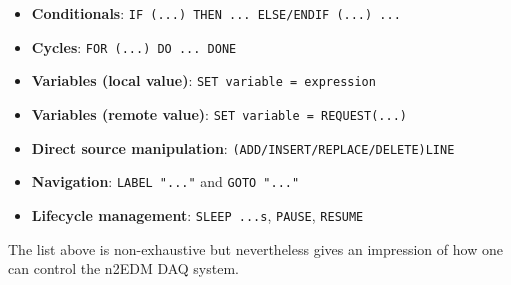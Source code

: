 \begin{itemize}
	\item \textbf{Conditionals}: \texttt{IF (...) THEN ... ELSE/ENDIF (...) ...}
	\item \textbf{Cycles}: \texttt{FOR (...) DO ... DONE}
	\item \textbf{Variables (local value)}: \texttt{SET variable = expression}
	\item \textbf{Variables (remote value)}: \texttt{SET variable = REQUEST(...)}
	\item \textbf{Direct source manipulation}: \texttt{(ADD/INSERT/REPLACE/DELETE)LINE}
	\item \textbf{Navigation}: \texttt{LABEL "..."} and \texttt{GOTO "..."}
	\item \textbf{Lifecycle management}: \texttt{SLEEP ...s}, \texttt{PAUSE}, \texttt{RESUME}
\end{itemize}

The list above is non-exhaustive but nevertheless gives an impression of how one can control the n2EDM DAQ system.





















